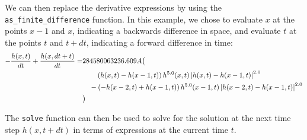 \documentclass{article}
\begin{document}


We can then replace the derivative expressions by using the
\texttt{as\_finite\_difference} function.  In this example, we chose to evaluate
$x$ at the points $x-1$ and $x$, indicating a backwards
difference in space, and evaluate $t$ at the points $t$ and
$t+dt$, indicating a forward difference in time:
\begin{equation}
    \begin{split}
        - \frac{h{\left(x,t \right)}}{dt} + \frac{h{\left(x,dt + t \right)}}{dt} = & 284580063236.609 A \big{(}\\
        &\qquad \left(h{\left(x,t \right)} - h{\left(x - 1,t \right)}\right) h^{5.0}{\left(x,t \right)} \left|{h{\left(x,t \right)} - h{\left(x - 1,t \right)}}\right|^{2.0} \\
        &\quad - \left(- h{\left(x - 2,t \right)} + h{\left(x - 1,t \right)}\right) h^{5.0}{\left(x - 1,t \right)} \left|{h{\left(x - 2,t \right)} - h{\left(x - 1,t \right)}}\right|^{2.0}\\
        &\big{)}
    \end{split}
\end{equation}


The \texttt{solve} function can then be used to solve for the solution at the
next time step $h(x, t+dt)$ in terms of expressions at the current time $t$.
\end{document}

